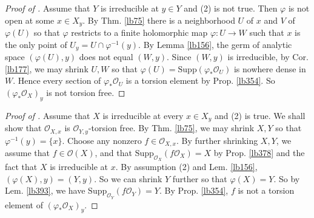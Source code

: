 \documentclass[12pt,b5paper,notitlepage]{report}
\theoremstyle{definition}
\theoremstyle{plain}
\newtheorem{lm}[df]{Lemma}
\DeclareMathOperator{\sann}{\mathscr{A}\text{\kern -3pt {\calligra\large nn}}\,}
\newcommand{\scr}{\mathscr}
\newcommand{\Supp}{\mathrm{Supp}}
\numberwithin{equation}{section}
\begin{document}
\begin{proof}[Proof of ]
Assume that $Y$ is irreducible at $y\in Y$ and (2) is not true. Then $\varphi$ is not open at some $x\in X_y$. By Thm. \ref{lb75} there is a neighborhood $U$ of $x$ and $V$ of $\varphi(U)$ so that $\varphi$ restricts to a finite holomorphic map $\varphi:U\rightarrow W$ such that $x$ is the only point of $U_y=U\cap\varphi^{-1}(y)$. By Lemma \ref{lb156}, the germ of analytic space $(\varphi(U),y)$ does not equal $(W,y)$. Since $(W,y)$ is irreducible, by Cor. \ref{lb177}, we may shrink $U,W$ so that $\varphi(U)=\Supp(\varphi_*\scr O_U)$ is nowhere dense in $W$. Hence every section of $\varphi_*\scr O_U$ is a torsion element by Prop. \ref{lb354}. So $(\varphi_*\scr O_X)_y$ is not torsion free.
\end{proof}



\begin{proof}[Proof of ]
Assume that $X$ is irreducible at every $x\in X_y$ and (2) is true. We shall show that $\scr O_{X,x}$ is $\scr O_{Y,y}$-torsion free. By Thm. \ref{lb75}, we may shrink $X,Y$ so that $\varphi^{-1}(y)=\{x\}$. Choose any nonzero $f\in\scr O_{X,x}$. By further shrinking $X,Y$, we assume that $f\in\scr O(X)$, and that $\Supp_{\scr O_X}(f\scr O_X)=X$ by Prop. \ref{lb378} and the fact that $X$ is irreducible at $x$. By assumption (2) and Lem. \ref{lb156}, $(\varphi(X),y)=(Y,y)$. So we can shrink $Y$ further so that $\varphi(X)=Y$. So by Lem. \ref{lb393}, we have $\Supp_{\scr O_Y}(f\scr O_Y)=Y$. By Prop. \ref{lb354}, $f$ is not a torsion element of $(\varphi_*\scr O_X)_y$.
\end{proof}


\begin{comment}
\begin{lm}
Let $\varphi:X\rightarrow Y$ be a finite morphism of complex space. Let $\scr E$ be a coherent $\scr O_X$-module. Then the following identity for complex spaces hold:
\begin{align}
\Supp_{\scr O_Y}(\varphi_*\scr E)=\varphi(\Supp_{\scr O_X}\scr E)
\end{align}
\end{lm}


\begin{proof}
Let $g\in\scr O_Y$. Then $g\in\sann_{\scr O_Y}(\varphi_*\scr E)$ iff $g\circ\varphi$ annihilates $\scr E$, iff $g\circ\varphi\in\sann_{\scr O_X}(\scr E)$, iff $g\circ\varphi$ annihilates $\scr O_{\Supp_{\scr O_X}(\scr E)}=\scr O_X/\sann_{\scr O_X}(\scr E)$, iff $g\in\sann_{\scr O_Y}(\varphi_*\scr O_{\Supp_{\scr O_X}(\scr E)})$.
\end{proof}
\end{comment}
\end{document}
